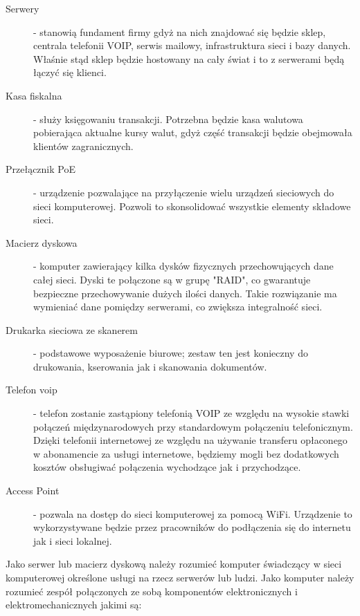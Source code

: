 				\begin{description}
					\item[Serwery] - stanowią fundament firmy gdyż na nich znajdować się będzie sklep, centrala telefonii VOIP, serwis mailowy, infrastruktura sieci i bazy danych. Właśnie stąd sklep będzie hostowany na cały świat i to z serwerami będą łączyć się klienci.

					\item[Kasa fiskalna] - służy księgowaniu transakcji. Potrzebna będzie kasa walutowa pobierająca aktualne kursy walut, gdyż część transakcji będzie obejmowała klientów zagranicznych.

					\item[Przełącznik PoE] - urządzenie pozwalające na przyłączenie wielu urządzeń sieciowych do sieci komputerowej. Pozwoli to skonsolidować wszystkie elementy składowe sieci.

					\item[Macierz dyskowa] - komputer zawierający kilka dysków fizycznych przechowujących dane całej sieci. Dyski te połączone są w grupę "RAID", co gwarantuje bezpieczne przechowywanie dużych ilości danych. Takie rozwiązanie ma wymieniać dane pomiędzy serwerami, co zwiększa integralność sieci.

					\item[Drukarka sieciowa ze skanerem] - podstawowe wyposażenie biurowe; zestaw ten jest konieczny do drukowania, kserowania jak i skanowania dokumentów. 

					\item[Telefon voip] - telefon zostanie zastąpiony telefonią VOIP ze względu na wysokie stawki połączeń międzynarodowych przy standardowym połączeniu telefonicznym. Dzięki telefonii internetowej ze względu na używanie transferu opłaconego w abonamencie za usługi internetowe, będziemy mogli bez dodatkowych kosztów obsługiwać połączenia wychodzące jak i przychodzące.

					\item[Access Point] - pozwala na dostęp do sieci komputerowej za pomocą WiFi. Urządzenie to wykorzystywane będzie przez pracowników do podłączenia się do internetu jak i sieci lokalnej.
				\end{description}
				
				\par Jako serwer lub macierz dyskową należy rozumieć komputer świadczący w sieci komputerowej określone usługi na rzecz serwerów lub ludzi. Jako komputer należy rozumieć zespół połączonych ze sobą komponentów elektronicznych i elektromechanicznych jakimi są:
				
